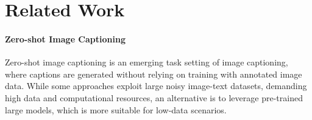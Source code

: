 \section{Related Work}


\paragraph{Zero-shot Image Captioning}
Zero-shot image captioning is an emerging task setting of image captioning, where captions are generated without relying on training with annotated image data. While some approaches \cite{Changpinyo,Wang_Yu_Yu_Dai_Tsvetkov_Cao_2021,flamingo} exploit large noisy image-text datasets, demanding high data and computational resources, an alternative is to leverage pre-trained large models, which is more suitable for low-data scenarios.

